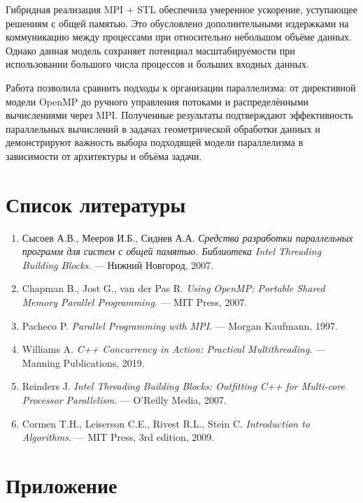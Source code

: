 \documentclass[12pt,a4paper]{extarticle}
\begin{document}
Гибридная реализация MPI + STL обеспечила умеренное ускорение, уступающее решениям с общей памятью. Это обусловлено дополнительными издержками на коммуникацию между процессами при относительно небольшом объёме данных. Однако данная модель сохраняет потенциал масштабируемости при использовании большого числа процессов и больших входных данных.

Работа позволила сравнить подходы к организации параллелизма: от директивной модели OpenMP до ручного управления потоками и распределёнными вычислениями через MPI. Полученные результаты подтверждают эффективность параллельных вычислений в задачах геометрической обработки данных и демонстрируют важность выбора подходящей модели параллелизма в зависимости от архитектуры и объёма задачи.

\section{Список литературы}

\begin{enumerate}
    \item Сысоев А.В., Мееров И.Б., Сиднев А.А. \textit{Средства разработки параллельных программ для систем с общей памятью. Библиотека Intel Threading Building Blocks}. — Нижний Новгород, 2007.

    \item Chapman B., Jost G., van der Pas R. \textit{Using OpenMP: Portable Shared Memory Parallel Programming}. — MIT Press, 2007.

    \item Pacheco P. \textit{Parallel Programming with MPI}. — Morgan Kaufmann, 1997.

    \item Williams A. \textit{C++ Concurrency in Action: Practical Multithreading}. — Manning Publications, 2019.

    \item Reinders J. \textit{Intel Threading Building Blocks: Outfitting C++ for Multi-core Processor Parallelism}. — O'Reilly Media, 2007.

    \item Cormen T.H., Leiserson C.E., Rivest R.L., Stein C. \textit{Introduction to Algorithms}. — MIT Press, 3rd edition, 2009.
\end{enumerate}

\section{Приложение}
\end{document}
